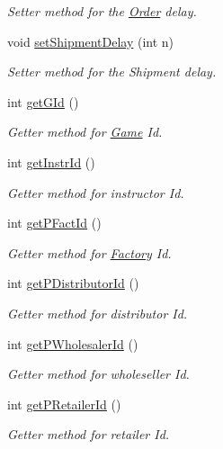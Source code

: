 \begin{DoxyCompactItemize}
\begin{DoxyCompactList}\small\item\em Setter method for the \hyperlink{class_order}{Order} delay. \end{DoxyCompactList}\item 
void \hyperlink{class_game_a1b45bb18641fd7b60c2b887899fe4464}{set\+Shipment\+Delay} (int n)
\begin{DoxyCompactList}\small\item\em Setter method for the Shipment delay. \end{DoxyCompactList}\item 
int \hyperlink{class_game_aea578dd12fcdf404231a14ecc18fb98a}{get\+G\+Id} ()
\begin{DoxyCompactList}\small\item\em Getter method for \hyperlink{class_game}{Game} Id. \end{DoxyCompactList}\item 
int \hyperlink{class_game_a52dd61290996a492087b81464eba52c8}{get\+Instr\+Id} ()
\begin{DoxyCompactList}\small\item\em Getter method for instructor Id. \end{DoxyCompactList}\item 
int \hyperlink{class_game_a9d4b2445fa34422a03d99edba54c0c28}{get\+P\+Fact\+Id} ()
\begin{DoxyCompactList}\small\item\em Getter method for \hyperlink{class_factory}{Factory} Id. \end{DoxyCompactList}\item 
int \hyperlink{class_game_ab59b422a861f1aa2d59c176b9b57ed80}{get\+P\+Distributor\+Id} ()
\begin{DoxyCompactList}\small\item\em Getter method for distributor Id. \end{DoxyCompactList}\item 
int \hyperlink{class_game_a7a93d4a8c499ee090efd397fc068a3c4}{get\+P\+Wholesaler\+Id} ()
\begin{DoxyCompactList}\small\item\em Getter method for wholeseller Id. \end{DoxyCompactList}\item 
int \hyperlink{class_game_ac8cb0ad6c01ecddc3c76bb0bdbc9202b}{get\+P\+Retailer\+Id} ()
\begin{DoxyCompactList}\small\item\em Getter method for retailer Id. \end{DoxyCompactList}\item 

\end{DoxyCompactItemize}
